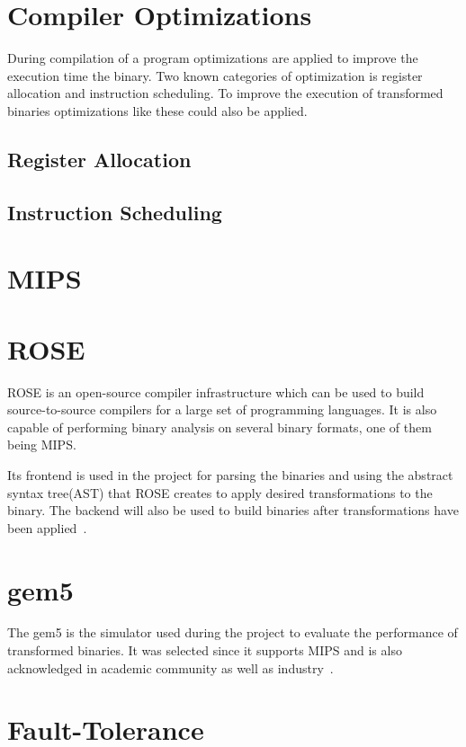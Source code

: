 

\section{Compiler Optimizations}
During compilation of a program optimizations are applied
to improve the execution time the binary. Two known categories
of optimization is register allocation and instruction scheduling.
To improve the execution of transformed binaries optimizations
like these could also be applied.

\subsection{Register Allocation}


\subsection{Instruction Scheduling}


\section{MIPS}

\section{ROSE}
ROSE is an open-source compiler infrastructure which can be used to build
source-to-source compilers for a large set of programming languages.
It is also capable of performing binary analysis on several
binary formats, one of them being MIPS.
%

Its frontend is used in the project for parsing the binaries and using
the abstract syntax tree(AST) that ROSE creates to apply desired
transformations to the binary. The backend will also be used to build
binaries after transformations have been applied~\cite{rose}.

\section{gem5}
The gem5 is the simulator used during the project to evaluate the performance
of transformed binaries. It was selected since it supports MIPS and
is also acknowledged in academic community as well as industry~\cite{gem5}.

\section{Fault-Tolerance}

